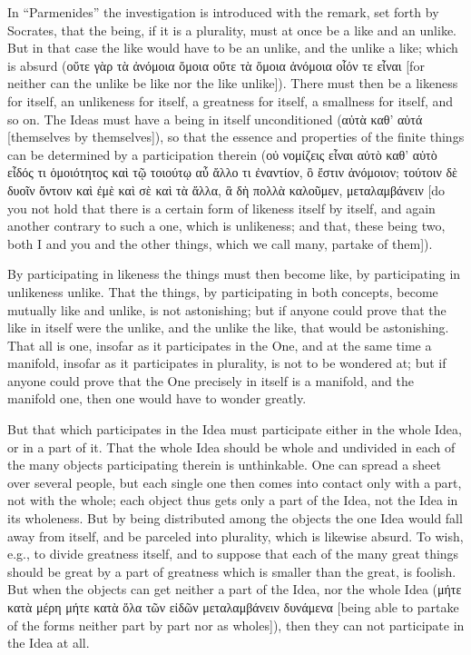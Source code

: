 \documentclass[12pt]{book}
\begin{document}
In ``Parmenides'' the investigation is introduced with the remark, set forth by Socrates, that the
being, if it is a plurality, must at once be a like and an unlike. But in that case the like would
have to be an unlike, and
the unlike a like; which is absurd (οὔτε γὰρ τὰ ἀνόμοια ὅμοια οὔτε τὰ ὅμοια ἀνόμοια οἷόν τε εἶναι
[for neither can the unlike be like nor the like unlike]). There must then be a likeness for
itself, an unlikeness for itself, a greatness for itself, a smallness for itself, and so on. The
Ideas must have a being in itself unconditioned (αὐτὰ καθ' αὑτά [themselves by themselves]), so
that the essence and properties of the finite things can be determined by a participation therein
(οὐ νομίζεις εἶναι αὐτὸ καθ' αὑτὸ εἶδός τι ὁμοιότητος καὶ τῷ τοιούτῳ αὖ ἄλλο τι ἐναντίον, ὃ ἔστιν
ἀνόμοιον; τούτοιν δὲ δυοῖν ὄντοιν καὶ ἐμὲ καὶ σὲ καὶ τὰ ἄλλα, ἃ δὴ πολλὰ καλοῦμεν, μεταλαμβάνειν
[do you not hold that there is a certain form of likeness itself by itself, and again another
contrary to such a one, which is unlikeness; and that, these being two, both I and you and the
other things, which we call many, partake of them]).

By participating in likeness the things must then become like, by participating in unlikeness
unlike. That the things, by participating in both concepts, become mutually like and unlike, is not
astonishing; but if anyone could prove that the like in itself were the unlike, and the unlike the
like, that would be astonishing. That all is one, insofar as it participates in the One, and at the
same time a manifold, insofar as it participates in plurality, is not to be wondered at; but if
anyone could prove that the One precisely in itself is a manifold, and the manifold one, then one
would have to wonder greatly.

But that which participates in the Idea must participate either in the whole Idea, or in a part of
it. That the whole Idea should be whole and undivided in each of the many objects participating
therein is unthinkable. One can spread a sheet over several people, but each single one then comes
into contact only with a part, not with the whole; each object thus gets only a part of the Idea,
not the Idea in its wholeness. But by being distributed among the objects the one Idea would fall
away from itself, and be parceled into plurality, which is likewise absurd. To wish, e.g., to
divide greatness itself, and to suppose that each of the many great things should be great by a
part of greatness which is smaller than the great, is foolish. But when the objects can get neither
a part of the Idea, nor the whole Idea (μήτε κατὰ μέρη
μήτε κατὰ ὅλα τῶν εἰδῶν μεταλαμβάνειν δυνάμενα [being able to partake of the forms neither part by
part nor as wholes]), then they can not participate in the Idea at all.
\end{document}
